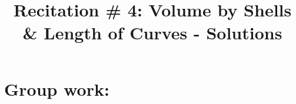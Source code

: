 \documentclass[noinstructornotes]{ximera}
\title{Recitation \# 4: Volume by Shells \& Length of Curves - Solutions}
\begin{document}
\begin{abstract}		\end{abstract}
\maketitle

\section{Group work:}
\end{document}
